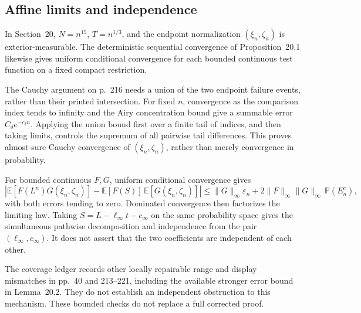 \documentclass[10pt]{article}
\begin{document}
\subsection*{Affine limits and independence}
In Section 20, \(N=n^{15}\), \(T=n^{1/3}\), and the endpoint normalization \((\xi_n,\zeta_n)\) is exterior-measurable. The deterministic sequential convergence of Proposition 20.1 likewise gives uniform conditional convergence for each bounded continuous test function on a fixed compact restriction.\par
The Cauchy argument on p. 216 needs a union of the two endpoint failure events, rather than their printed intersection. For fixed \(n\), convergence as the comparison index tends to infinity and the Airy concentration bound give a summable error \(C_\delta e^{-c_\delta n}\). Applying the union bound first over a finite tail of indices, and then taking limits, controls the supremum of all pairwise tail differences. This proves almost-sure Cauchy convergence of \((\xi_n,\zeta_n)\), rather than merely convergence in probability.\par
For bounded continuous \(F,G\), uniform conditional convergence gives \[\left|\mathbb E[F(L^n)G(\xi_n,\zeta_n)]
 -\mathbb E[F(S)]\,\mathbb E[G(\xi_n,\zeta_n)]\right|
 \le \|G\|_\infty\varepsilon_n+
 2\|F\|_\infty\|G\|_\infty\,\mathbb P(E_n^c),\] with both errors tending to zero. Dominated convergence then factorizes the limiting law. Taking \(S=L-\ell_\infty t-c_\infty\) on the same probability space gives the simultaneous pathwise decomposition and independence from the pair \((\ell_\infty,c_\infty)\). It does not assert that the two coefficients are independent of each other.\par
The coverage ledger records other locally repairable range and display mismatches in pp. 40 and 213–221, including the available stronger error bound in Lemma 20.2. They do not establish an independent obstruction to this mechanism. These bounded checks do not replace a full corrected proof.\par
\end{document}
